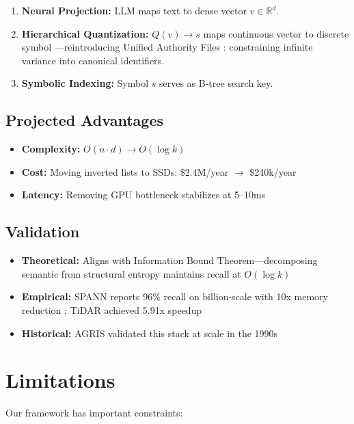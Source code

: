 \documentclass[manuscript,screen,nonacm]{acmart}
\begin{document}
\begin{enumerate}
    \item \textbf{Neural Projection:} LLM maps text to dense vector $v \in \mathbb{R}^d$.
    \item \textbf{Hierarchical Quantization:} $Q(v) \rightarrow s$ maps continuous vector to discrete symbol \cite{zandieh2025}---reintroducing Unified Authority Files \cite{caprazli2003}: constraining infinite variance into canonical identifiers.
    \item \textbf{Symbolic Indexing:} Symbol $s$ serves as B-tree search key.
\end{enumerate}

\subsection{Projected Advantages}

\begin{itemize}
    \item \textbf{Complexity:} $O(n \cdot d) \to O(\log k)$
    \item \textbf{Cost:} Moving inverted lists to SSDs: \$2.4M/year $\to$ \$240k/year \cite{vectordb2024}
    \item \textbf{Latency:} Removing GPU bottleneck stabilizes at 5--10ms
\end{itemize}

\subsection{Validation}

\begin{itemize}
    \item \textbf{Theoretical:} Aligns with Information Bound Theorem---decomposing semantic from structural entropy maintains recall at $O(\log k)$ \cite{korten2025}
    \item \textbf{Empirical:} SPANN reports 96\% recall on billion-scale with 10x memory reduction \cite{chen2021}; TiDAR achieved 5.91x speedup \cite{liu2024}
    \item \textbf{Historical:} AGRIS validated this stack at scale in the 1990s \cite{fao2005}
\end{itemize}

\section{Limitations}

Our framework has important constraints:
\end{document}
